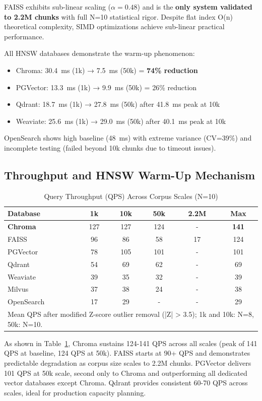 \documentclass{article}
\begin{document}
FAISS exhibits sub-linear scaling ($\alpha=0.48$) and is the \textbf{only system validated to 2.2M chunks} with full N=10 statistical rigor. Despite flat index O(n) theoretical complexity, SIMD optimizations achieve sub-linear practical performance.

All HNSW databases demonstrate the warm-up phenomenon:
\begin{itemize}
    \item Chroma: 30.4~ms (1k) → 7.5~ms (50k) = \textbf{74\% reduction}
    \item PGVector: 13.3~ms (1k) → 9.9~ms (50k) = 26\% reduction
    \item Qdrant: 18.7~ms (1k) → 27.8~ms (50k) after 41.8~ms peak at 10k
    \item Weaviate: 25.6~ms (1k) → 29.0~ms (50k) after 40.1~ms peak at 10k
\end{itemize}

OpenSearch shows high baseline (48~ms) with extreme variance (CV=39\%) and incomplete testing (failed beyond 10k chunks due to timeout issues).

\subsection{Throughput and HNSW Warm-Up Mechanism}
\label{sec:hnsw_warmup}
\begin{table}[h]
\small
\centering
\caption{Query Throughput (QPS) Across Corpus Scales (N=10)}
\begin{tabular}{lccccc}
\toprule
\textbf{Database} & \textbf{1k} & \textbf{10k} & \textbf{50k} & \textbf{2.2M} & \textbf{Max} \\
\midrule
\textbf{Chroma} & 127 & 127 & 124 & - & \textbf{141} \\
FAISS & 96 & 86 & 58 & 17 & 124 \\
PGVector & 78 & 105 & 101 & - & 101 \\
Qdrant & 54 & 69 & 62 & - & 69 \\
Weaviate & 39 & 35 & 32 & - & 39 \\
Milvus & 37 & 38 & 24 & - & 38 \\
OpenSearch & 17 & 29 & - & - & 29 \\
\bottomrule
\multicolumn{6}{l}{\small *Mean QPS after modified Z-score outlier removal (|Z| > 3.5); 1k and 10k: N=8, 50k: N=10.}
\end{tabular}
\label{tab:throughput}
\end{table}

As shown in Table~\ref{tab:throughput}, Chroma sustains 124-141 QPS across all scales (peak of 141 QPS at baseline, 124 QPS at 50k). FAISS starts at 90+ QPS and demonstrates predictable degradation as corpus size scales to 2.2M chunks. PGVector delivers 101 QPS at 50k scale, second only to Chroma and outperforming all dedicated vector databases except Chroma. Qdrant provides consistent 60-70 QPS across scales, ideal for production capacity planning.
\end{document}

